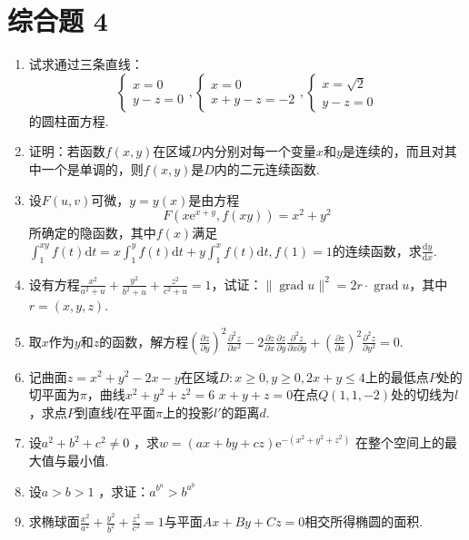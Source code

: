 \section{综合题 4}
\begin{enumerate}
	\item 试求通过三条直线：
	\[
	\left\{\begin{array}{l}{x=0} \\ {y-z=0}\end{array}\right., \left\{\begin{array}{l}{x=0} \\ {x+y-z=-2}\end{array}\right., \left\{\begin{array}{l}{x=\sqrt{2}} \\ {y-z=0}\end{array}\right.
	\]
	的圆柱面方程.
	\item 证明：若函数$f(x,y)$在区域$D$内分别对每一个变量$x$和$y$是连续的，而且对其中一个是单调的，则$f(x,y)$是$D$内的二元连续函数.
	
	\item 设$F(u,v)$可微，$y=y(x)$是由方程\[
	F\left(x \mathrm{e}^{x+y}, f(x y)\right)=x^{2}+y^{2}
	\]所确定的隐函数，其中$f(x)$满足$
	\int_{1}^{x y} f(t) \mathrm{d} t=x \int_{1}^{y} f(t) \mathrm{d} t+y \int_{1}^{x} f(t) \mathrm{d} t, f(1)=1
	$的连续函数，求$\frac{ \mathrm{d} y}{ \mathrm{d}x}$.
	\item 设有方程$\frac{x^{2}}{a^{2}+u}+\frac{y^{2}}{b^{2}+u}+\frac{z^{2}}{c^{2}+u}=1$，试证：$\|\operatorname{grad} u\|^{2}=2 r \cdot \operatorname{grad} u$，其中$r=(x,y,z)$.
	\item 取$x$作为$y$和$z$的函数，解方程$\left(\frac{\partial z}{\partial y}\right)^{2} \frac{\partial^{2} z}{\partial x^{2}}-2 \frac{\partial z}{\partial x} \frac{\partial z}{\partial y} \frac{\partial^{2} z}{\partial x \partial y}+\left(\frac{\partial z}{\partial x}\right)^{2} \frac{\partial^{2} z}{\partial y^{2}}=0$.
	\item 记曲面$z=x^{2}+y^{2}-2 x-y$在区域$D :  x \geqslant 0, y \geqslant 0,2 x+y \leqslant 4$上的最低点$P$处的切平面为$\pi$，曲线$x^{2}+y^{2}+z^{2}=6$
	$x+y+z=0$在点$Q(1,1,-2)$处的切线为$l$，求点$P$到直线$l$在平面$\pi$上的投影$l'$的距离$d$.
	\item 设$a^{2}+b^{2}+c^{2} \neq 0$ ，求$w=(a x+b y+c z) \mathrm{e}^{-\left(x^{2}+y^{2}+z^{2}\right)}$ 在整个空间上的最大值与最小值.
	
	\item 设$a>b>1$ ，求证：$a^{b^{a}}>b^{a^{b}}$
	\item 求椭球面$\frac{x^{2}}{a^{2}}+\frac{y^{2}}{b^{2}}+\frac{z^{2}}{c^{2}}=1$与平面$Ax+By+Cz=0$相交所得椭圆的面积.
	

\end{enumerate}
